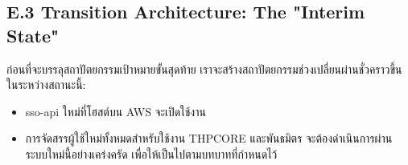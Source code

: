 \subsection{E.3 Transition Architecture: The "Interim State"}
ก่อนที่จะบรรลุสถาปัตยกรรมเป้าหมายขั้นสุดท้าย เราจะสร้างสถาปัตยกรรมช่วงเปลี่ยนผ่านชั่วคราวขึ้น ในระหว่างสถานะนี้:\par

\begin{itemize}
    \item sso-api ใหม่ที่โฮสต์บน AWS จะเปิดใช้งาน
    \item การจัดสรรผู้ใช้ใหม่ทั้งหมดสำหรับใช้งาน THPCORE และพันธมิตร จะต้องดำเนินการผ่านระบบใหม่นี้อย่างเคร่งครัด เพื่อให้เป็นไปตามบทบาทที่กำหนดไว้
\end{itemize}
\fussy

